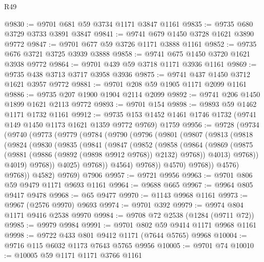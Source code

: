 \begin{lexlean}{R49}
\begin{coremodule}
@9830 := @9701 @681 @59 @3734 @1171 @3847 @1161
@9835 := @9735 @680 @3729 @3733 @3891 @3847
@9841 := @9741 @679 @1450 @3728 @1621 @3890 @9772
@9847 := @9701 @677 @59 @3726 @1171 @3888 @1161
@9852 := @9735 @676 @3721 @3725 @3939 @3888
@9858 := @9741 @675 @1450 @3720 @1621 @3938 @9772
@9864 := @9701 @439 @59 @3718 @1171 @3936 @1161
@9869 := @9735 @438 @3713 @3717 @3958 @3936
@9875 := @9741 @437 @1450 @3712 @1621 @3957 @9772
@9881 := @9701 @208 @59 @1905 @1171 @2099 @1161
@9886 := @9735 @207 @1900 @1904 @2114 @2099
@9892 := @9741 @206 @1450 @1899 @1621 @2113 @9772
@9893 := @9701 @154
@9898 := @9893 @59 @1462 @1171 @1732 @1161
@9912 := @9735 @153 @1452 @1461 @1746 @1732 (@9741 @149 @1450 @1173 @1621 @1359 @9772 @9769) @1759
@9956 := @9728
    (@9734
      (@9740
        (@9773
          (@9779
            (@9784
              (@9790
                (@9796
                  (@9801
                    (@9807
                      (@9813
                        (@9818
                          (@9824
                            (@9830
                              (@9835
                                (@9841
                                  (@9847
                                    (@9852
                                      (@9858
                                        (@9864
                                          (@9869
                                            (@9875
                                              (@9881
                                                (@9886 (@9892 (@9898 @9912 @9768)) @2132)
                                                @9768))
                                            @4013)
                                          @9768))
                                      @4019)
                                    @9768))
                                @4025)
                              @9768))
                          @4564)
                        @9768))
                    @4570)
                  @9768))
              @4576)
            @9768))
        @4582)
      @9769)
    @7906
@9957 := @9721 @9956
@9963 := @9701 @806 @59 @9479 @1171 @9693 @1161
@9964 := @9688 @665
@9967 := @9964 @805 @9417 @9478
@9968 := @65 @9477
@9970 := @1143 @9968 @1161
@9973 := @9967 (@2576 @9970) @9693
@9974 := @9701 @392
@9979 := @9974 @804 @1171 @9416 @2538 @9970
@9984 := @9708 @72 @2538 (@1284 (@9711 @72))
@9985 := @9979 @9984
@9991 := @9701 @802 @59 @9414 @1171 @9968 @1161
@9998 := @9722 @433 @801 @9412 @1171 (@7644 @5765) @9968
@10004 := @9716 @115 @6032 @1173 @7643 @5765 @9956
@10005 := @9701 @74
@10010 := @10005 @59 @1171 @1171 @3766 @1161

\end{coremodule}
\end{lexlean}
